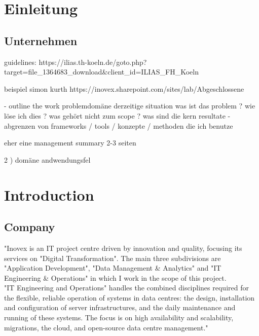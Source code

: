 \section{Einleitung}
\subsection{Unternehmen}
guidelines: https://ilias.th-koeln.de/goto.php?target=file_1364683_download&client_id=ILIAS_FH_Koeln

beispiel simon kurth
https://inovex.sharepoint.com/sites/lab/Abgeschlossene%

- outline the work
problemdomäne
derzeitige situation
was ist das problem ?
wie löse ich dies ?
was gehört nicht zum scope ?
was sind die kern resultate
- abgrenzen von frameworks / tools / konzepte / methoden die ich benutze

eher eine management summary
2-3 seiten

2 ) domäne andwendungsfel

\section{Introduction}
\subsection{Company}
"Inovex is an IT project centre driven by innovation and quality, focusing its services on "Digital Transformation". The main three subdivisions are "Application Development", "Data Management \& Analytics" and "IT Engineering \& Operations" in which I work in the scope of this project.\\
"IT Engineering and Operations" handles the combined disciplines required for the flexible, reliable operation of systems in data centres: the design, installation and configuration of server infrastructures, and the daily maintenance and running of these systems. The focus is on high availability and scalability, migrations, the cloud, and open-source data centre management."\cite{inovex}

